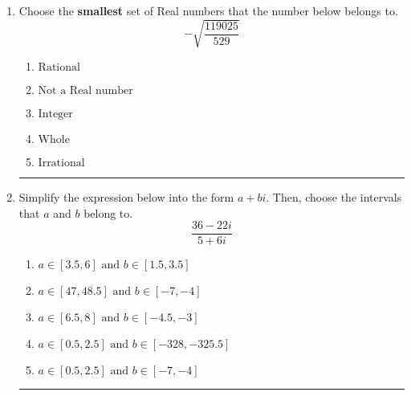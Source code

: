\documentclass[14pt]{extbook}
\newcommand{\litem}[1]{\item#1\hspace*{-1cm}\rule{\textwidth}{0.4pt}}
\begin{document}
\begin{enumerate}
{\begin{enumerate}[label=\Alph*.]
\end{enumerate} }
\litem{
Choose the \textbf{smallest} set of Real numbers that the number below belongs to.\[ -\sqrt{\frac{119025}{529}} \]\begin{enumerate}[label=\Alph*.]
\item \( \text{Rational} \)
\item \( \text{Not a Real number} \)
\item \( \text{Integer} \)
\item \( \text{Whole} \)
\item \( \text{Irrational} \)

\end{enumerate} }
\litem{
Simplify the expression below into the form $a+bi$. Then, choose the intervals that $a$ and $b$ belong to.\[ \frac{36 - 22 i}{5 + 6 i} \]\begin{enumerate}[label=\Alph*.]
\item \( a \in [3.5, 6] \text{ and } b \in [1.5, 3.5] \)
\item \( a \in [47, 48.5] \text{ and } b \in [-7, -4] \)
\item \( a \in [6.5, 8] \text{ and } b \in [-4.5, -3] \)
\item \( a \in [0.5, 2.5] \text{ and } b \in [-328, -325.5] \)
\item \( a \in [0.5, 2.5] \text{ and } b \in [-7, -4] \)

\end{enumerate} }
\end{enumerate}
\end{document}
